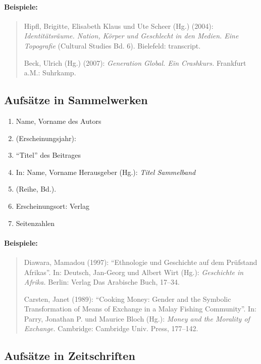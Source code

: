 \documentclass[ 12pt,
                titlepage,
                parskip=half,
                version=first,
                bibliography=totocnumbered,
                final,
                listof=totoc]{scrartcl}
\begin{document}
\paragraph{Beispiele:}
\begin{quote}
Hipfl, Brigitte, Elisabeth Klaus und Ute Scheer (Hg.) (2004):
\emph{Identitätsräume. Nation, Körper und Geschlecht in den Medien. Eine
Topografie} (Cultural Studies Bd. 6). Bielefeld: transcript.

Beck, Ulrich (Hg.) (2007): \emph{Generation Global. Ein Crashkurs.} Frankfurt
a.M.: Suhrkamp.
\end{quote}

\subsection{Aufsätze in Sammelwerken}
\label{sec:sub_aufsätze_in_sammelwerken}

\begin{enumerate}
    \item Name, Vorname des Autors
    \item (Erscheinungsjahr):
    \item \enquote{Titel} des Beitrages
    \item In: Name, Vorname Herausgeber (Hg.): \emph{Titel Sammelband}
    \item (Reihe, Bd.).
    \item Erscheinungsort: Verlag
    \item Seitenzahlen
\end{enumerate}

\paragraph{Beispiele:}
\begin{quote}
Diawara, Mamadou (1997): \enquote{Ethnologie und Geschichte auf dem Prüfstand
Afrikas}. In: Deutsch, Jan-Georg und Albert Wirt (Hg.): \emph{Geschichte in
Afrika.} Berlin: Verlag Das Arabische Buch, 17--34.

Carsten, Janet (1989): \enquote{Cooking Money: Gender and the Symbolic
Transformation of Means of Exchange in a Malay Fishing Community}. In: Parry,
Jonathan P. und Maurice Bloch (Hg.): \emph{Money and the Morality of Exchange.}
Cambridge: Cambridge Univ. Press, 177--142.
\end{quote}

\subsection{Aufsätze in Zeitschriften}
\label{sec:sub_aufsätze_in_zeitschriften}
\end{document}
